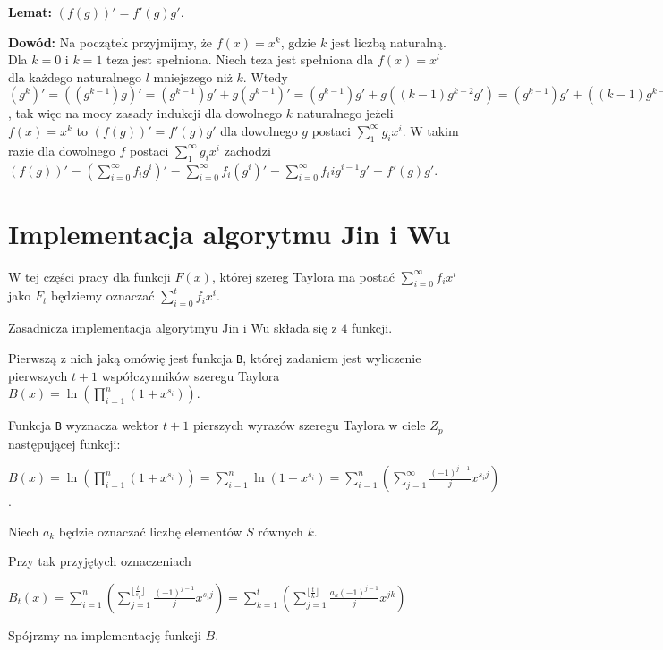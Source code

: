 \documentclass{article}
\begin{document}
\begin{tcolorbox}
    \textbf{Lemat:} $(f(g))'=f'(g)g'$.
    
    \textbf{Dowód:} Na początek przyjmijmy, że $f(x)=x^k$, gdzie $k$ jest liczbą naturalną. Dla $k=0$ i $k=1$ teza jest 
    spełniona. Niech teza jest spełniona dla $f(x)=x^l$ dla każdego naturalnego $l$ mniejszego niż $k$.
    Wtedy
    $(g^k)'=((g^{k-1})g)'=(g^{k-1})g'+g(g^{k-1})'=(g^{k-1})g'+g((k-1)g^{k-2}g')=
    (g^{k-1})g'+((k-1)g^{k-1}g')=kg^{k-1}g'$, tak więc na mocy zasady indukcji dla dowolnego $k$ naturalnego jeżeli $f(x)=x^k$ to $(f(g))'=f'(g)g'$ dla dowolnego $g$ postaci $\sum_{1}^{\infty}g_ix^i$. W takim razie dla dowolnego $f$
    postaci $\sum_{1}^{\infty}g_ix^i$ zachodzi  $(f(g))'=(\sum_{i=0}^{\infty}f_ig^i)'=\sum_{i=0}^{\infty}f_i(g^i)'=
    \sum_{i=0}^{\infty}f_i ig^{i-1}g'=f'(g)g'$.

    
    
    
    
    
    
    
    
\end{tcolorbox}


\section{Implementacja algorytmu Jin i Wu}
W tej części pracy dla funkcji $F(x)$, której szereg Taylora ma postać $\sum_{i=0}^{\infty}f_ix^i$ jako $F_t$ będziemy
oznaczać $\sum_{i=0}^{t}f_ix^i$.

Zasadnicza implementacja algorytmyu Jin i Wu składa się z $4$ funkcji. 

Pierwszą z nich jaką omówię jest funkcja \texttt{B}, której zadaniem jest wyliczenie pierwszych 
$t+1$ współczynników szeregu Taylora $B(x)=\ln(\prod_{i=1}^n(1+x^{s_i}))$.

Funkcja \texttt{B} wyznacza wektor $t+1$ pierszych wyrazów szeregu Taylora w ciele $Z_p$ następującej 
funkcji:
\begin{center}
$B(x)=\ln(\prod_{i=1}^n(1+x^{s_i}))=\sum_{i=1}^n \ln(1+x^{s_i})=\sum_{i=1}^n(\sum_{j=1}^\infty
\frac{(-1)^{j-1}}{j}x^{s_i j})$.
\end{center}

Niech $a_k$ będzie oznaczać liczbę elementów $S$ równych $k$.

Przy tak przyjętych oznaczeniach 

\begin{center}
$B_t(x)=\sum_{i=1}^n (\sum_{j=1}^{\lfloor \frac{t}{s_i} \rfloor}\frac{(-1)^{j-1}}{j}x^{s_ij})
=\sum_{k=1}^t (\sum_{j=1}^{\lfloor \frac{t}{k} \rfloor}\frac{a_k(-1)^{j-1}}{j}x^{jk})$
\end{center}
Spójrzmy na implementację funkcji $B$.
\end{document}
